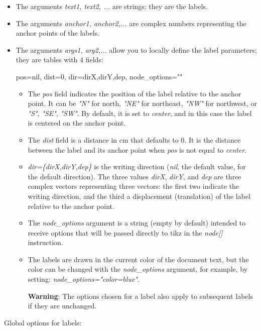 \begin{itemize}
\begin{itemize}
    \item The arguments \emph{text1, text2, ...} are strings; they are the labels.     \item The arguments \emph{anchor1, anchor2,...} are complex numbers representing the anchor points of the labels.
    \item The arguments \emph{args1, arg2,...} allow you to locally define the label parameters; they are tables with 4 fields:
\begin{TeXcode}
{ pos=nil, dist=0, dir={dirX,dirY,dep}, node_options="" }
\end{TeXcode}
\begin{itemize}
    \item The \emph{pos} field indicates the position of the label relative to the anchor point. It can be \emph{"N"} for north, \emph{"NE"} for northeast, \emph{"NW"} for northwest, or \emph{"S"}, \emph{"SE"}, \emph{"SW"}. By default, it is set to \emph{center}, and in this case the label is centered on the anchor point.
    \item The \emph{dist} field is a distance in cm that defaults to $0$. It is the distance between the label and its anchor point when \emph{pos} is not equal to \emph{center}.
    \item \emph{dir=\{dirX,dirY,dep\}} is the writing direction (\emph{nil}, the default value, for the default direction). The three values ​​\emph{dirX}, \emph{dirY}, and \emph{dep} are three complex vectors representing three vectors: the first two indicate the writing direction, and the third a displacement (translation) of the label relative to the anchor point.     \item The \emph{node\_options} argument is a string (empty by default) intended to receive options that will be passed directly to tikz in the \emph{node{[}{]}} instruction.
    \item The labels are drawn in the current color of the document text, but the color can be changed with the \emph{node\_options} argument, for example, by setting: \emph{node\_options="color=blue"}.

\textbf{Warning}: The options chosen for a label also apply to subsequent labels if they are unchanged.
\end{itemize}
\end{itemize}

Global options for labels:


\end{itemize}
